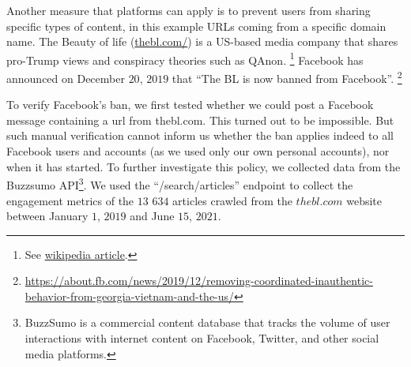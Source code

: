 \documentclass{article}
\begin{document}
Another measure that platforms can apply is to prevent users from sharing specific types of content, in this example URLs coming from a specific domain name. The Beauty of life (\href{https://thebl.com/}{thebl.com/}) is a US-based media company that shares pro-Trump views and conspiracy theories such as QAnon.
\footnote{ See \href{https://en.wikipedia.org/wiki/The\_Epoch\_Times\#Removal\_of\_The\_BL\_(The\_Beauty\_of\_Life)\_from\_Facebook}{wikipedia article}.} 
Facebook has announced on December $20$, $2019$ that ``The BL is now banned from Facebook''.
\footnote{\url{https://about.fb.com/news/2019/12/removing-coordinated-inauthentic-behavior-from-georgia-vietnam-and-the-us/}}

To verify Facebook’s ban, we first tested whether we could post a Facebook message containing a url from thebl.com. This turned out to be impossible. But such manual verification cannot inform us whether the ban applies indeed to all Facebook users and accounts (as we used only our own personal accounts), nor when it has started. To further investigate this policy, we collected data from the Buzzsumo API\footnote{BuzzSumo is a commercial content database that tracks the volume of user interactions with internet content on Facebook, Twitter, and other social media platforms.}. We used the ``/search/articles'' endpoint to collect the engagement metrics of the $13$ $634$ articles crawled from the $thebl.com$ website between January $1$, $2019$ and June $15$, $2021$.
\end{document}
